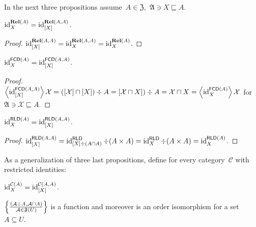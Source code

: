 In the next three propositions
assume~$A\in\mathfrak{Z}$,~$\mathfrak{A}\ni X\sqsubseteq A$.

\begin{prop}
$\operatorname{id}^{\mathcal{\mathbf{Rel}}(A)}_X = \operatorname{id}^{\mathcal{\mathbf{Rel}}(A,A)}_{[X]}$.
\end{prop}

\begin{proof}
$\operatorname{id}^{\mathcal{\mathbf{Rel}}(A,A)}_{[X]}=
\operatorname{id}^{\mathcal{\mathbf{Rel}}(A,A)}_X=
\operatorname{id}^{\mathcal{\mathbf{Rel}}(A)}_X$.
\end{proof}

\begin{prop}
$\operatorname{id}^{\mathcal{\mathsf{FCD}}(A)}_X = \operatorname{id}^{\mathcal{\mathsf{FCD}}(A,A)}_{[X]}$.
\end{prop}

\begin{proof}
$\left\langle \operatorname{id}^{\mathcal{\mathsf{FCD}}(A,A)}_{[X]}\right\rangle\mathcal{X}=
([\mathcal{X}]\sqcap[X])\div A=
[\mathcal{X}\sqcap X])\div A=\mathcal{X}\sqcap X=
\left\langle \operatorname{id}^{\mathcal{\mathsf{FCD}}(A)}_X\right\rangle\mathcal{X}$
for~$\mathfrak{A}\ni\mathcal{X}\sqsubseteq A$.
\end{proof}

\begin{prop}
$\operatorname{id}^{\mathcal{\mathsf{RLD}}(A)}_X = \operatorname{id}^{\mathcal{\mathsf{RLD}}(A,A)}_{[X]}$.
\end{prop}

\begin{proof}
$\operatorname{id}^{\mathcal{\mathsf{RLD}}(A,A)}_{[X]}=
\operatorname{id}^{\mathsf{RLD}}_{[X]\div(A\cap A)}\div(A\times A)=
\operatorname{id}^{\mathsf{RLD}}_X\div(A\times A)=\operatorname{id}^{\mathsf{RLD}(A)}_X$.
\end{proof}

As a generalization of three last propositions, define for
every category~$\mathcal{C}$ with restricted identities:

\begin{defn}
$\operatorname{id}^{\mathcal{C}(A)}_X = \operatorname{id}^{\mathcal{C}(A,A)}_{[X]}$.
\end{defn}

\begin{prop}
  $\left\{ \frac{ (\mathcal{A} \div A , \mathcal{A} \sqcap A) }{
  \mathcal{A} \in \mathfrak{F} (U) }\right\}$ is a function and
  moreover is an order isomorphism for a set $A \subseteq U$.
\end{prop}


